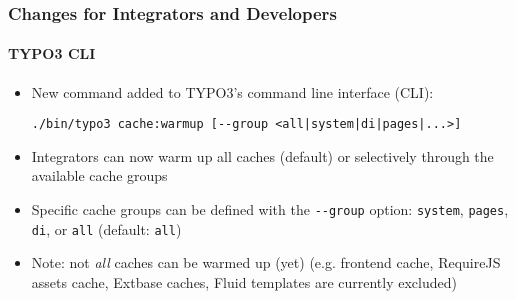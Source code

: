 %

\begin{frame}[fragile]
	\frametitle{Changes for Integrators and Developers}
	\framesubtitle{TYPO3 CLI}


	\begin{itemize}
		\item New command added to TYPO3's command line interface (CLI):
\begin{lstlisting}
./bin/typo3 cache:warmup [--group <all|system|di|pages|...>]
\end{lstlisting}
		\item Integrators can now warm up all caches (default) or selectively
			through the available cache groups
		\item Specific cache groups can be defined with the
			\texttt{-}\texttt{-group} option:\newline
			\small\texttt{system}, \texttt{pages}, \texttt{di}, or \texttt{all} (default: \texttt{all})\normalsize
		\item Note: not \textit{all} caches can be warmed up (yet)\newline
			\small(e.g. frontend cache, RequireJS assets cache, Extbase caches,
				Fluid templates are currently excluded)\normalsize
	\end{itemize}
\end{frame}

